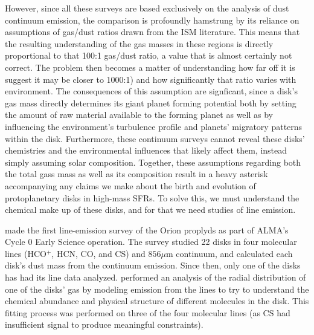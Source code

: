 However, since all these surveys are based exclusively on the analysis of dust continuum emission, the comparison is profoundly hamstrung by its reliance on assumptions of gas/dust ratios drawn from the ISM literature. This means that the resulting understanding of the gas masses in these regions is directly proportional to that 100:1 gas/dust ratio, a value that is almost certainly not correct. The problem then becomes a matter of understanding how far off it is \citet{Yu2017} suggest it may be closer to 1000:1) and how significantly that ratio varies with environment. The consequences of this assumption are signficant, since a disk's gas mass directly determines its giant planet forming potential both by setting the amount of raw material available to the forming planet as well as by influencing the environment's turbulence profile and planets' migratory patterns within the disk. Furthermore, these continuum surveys cannot reveal these disks' chemistries and the environmental influences that likely affect them, instead simply assuming solar composition. Together, these assumptions regarding both the total gass mass as well as its composition result in a heavy asterisk accompanying any claims we make about the birth and evolution of protoplanetary disks in high-mass SFRs. To solve this, we must understand the chemical make up of these disks, and for that we need studies of line emission.


\citet{Mann2014} made the first line-emission survey of the Orion proplyds as part of ALMA's Cycle 0 Early Science operation. The survey studied 22 disks in four molecular lines (HCO$^+$, HCN, CO, and CS) and $856 \mu$m continuum, and calculated each disk's dust mass from the continuum emission. Since then, only one of the disks has had its line data analyzed. \cite{Factor2017} performed an analysis of the radial distribution of one of the disks' gas by modeling emission from the lines to try to understand the chemical abundance and physical structure of different molecules in the disk. This fitting process was performed on three of the four molecular lines (as CS had insufficient signal to produce meaningful constraints).

